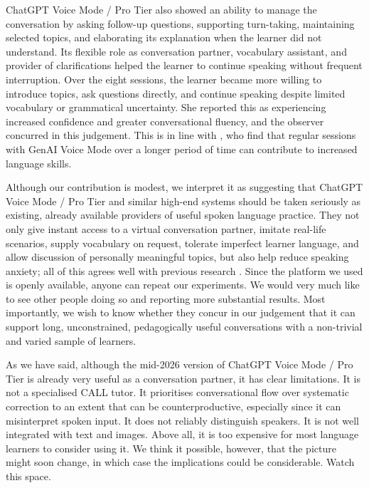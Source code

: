 \documentclass[11pt,a4paper]{article}
\begin{document}
ChatGPT Voice Mode / Pro Tier also showed an ability to manage the conversation by asking follow-up questions, supporting turn-taking, maintaining selected topics, and elaborating its explanation when the learner did not understand. Its flexible role as conversation partner, vocabulary assistant, and provider of clarifications helped the learner to continue speaking without frequent interruption. Over the eight sessions, the learner became more willing to introduce topics, ask questions directly, and continue speaking despite limited vocabulary or grammatical uncertainty. She reported this as experiencing increased confidence and greater conversational fluency, and the observer concurred in this judgement. This is in line with \citet{CarreraNunezEtAl2025}, who find that regular sessions with GenAI Voice Mode over a longer period of time can contribute to increased language skills.

Although our contribution is modest, we interpret it as suggesting that ChatGPT Voice Mode / Pro Tier and similar high-end systems should be taken seriously as existing, already available providers of useful spoken language practice. They not only give instant access to a virtual conversation partner, imitate real-life scenarios, supply vocabulary on request, tolerate imperfect learner language, and allow discussion of personally meaningful topics, but also help reduce speaking anxiety; all of this agrees well with previous research \citep{DuDaniel2024,MengZou2026,SaarelaEtAl2026}. Since the platform we used is openly available, anyone can repeat our experiments. We would very much like to see other people doing so and reporting more substantial results. Most importantly, we wish to know whether they concur in our judgement that it can support long, unconstrained, pedagogically useful conversations with a non-trivial and varied sample of learners.

As we have said, although the mid-2026 version of ChatGPT Voice Mode / Pro Tier is already very useful as a conversation partner, it has clear limitations. It is not a specialised CALL tutor. It prioritises conversational flow over systematic correction to an extent that can be counterproductive, especially since it can misinterpret spoken input. It does not reliably distinguish speakers. It is not well integrated with text and images. Above all, it is too expensive for most language learners to consider using it. We think it possible, however, that the picture might soon change, in which case the implications could be considerable. Watch this space.
\end{document}
